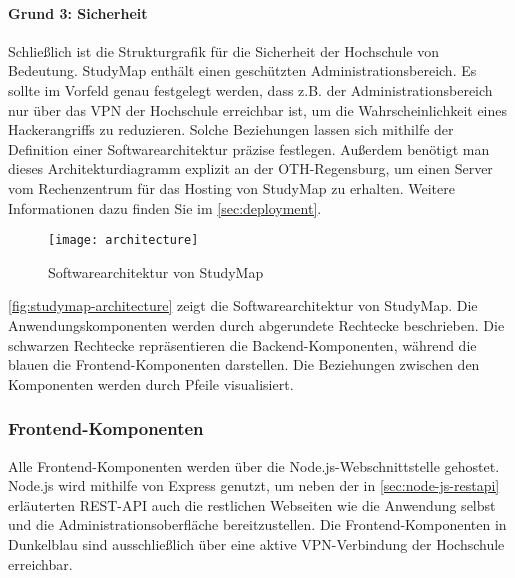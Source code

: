 \paragraph*{Grund 3: Sicherheit}
Schließlich ist die Strukturgrafik für die Sicherheit der Hochschule von Bedeutung. StudyMap enthält einen geschützten Administrationsbereich. Es sollte im Vorfeld genau festgelegt werden, dass z.B. der Administrationsbereich nur über das VPN der Hochschule erreichbar ist, um die Wahrscheinlichkeit eines Hackerangriffs zu reduzieren. Solche Beziehungen lassen sich mithilfe der Definition einer Softwarearchitektur präzise festlegen. Außerdem benötigt man dieses Architekturdiagramm explizit an der OTH-Regensburg, um einen Server vom Rechenzentrum für das Hosting von StudyMap zu erhalten. Weitere Informationen dazu finden Sie im \autoref{sec:deployment}.

\begin{figure}[H]
    \centering
    \texttt{[image: architecture]}
    \caption{Softwarearchitektur von StudyMap}
    \label{fig:studymap-architecture}
\end{figure}

\autoref{fig:studymap-architecture} zeigt die Softwarearchitektur von StudyMap. Die Anwendungskomponenten werden durch abgerundete Rechtecke beschrieben. Die schwarzen Rechtecke repräsentieren die Backend-Komponenten, während die blauen die Frontend-Komponenten darstellen. Die Beziehungen zwischen den Komponenten werden durch Pfeile visualisiert.

\subsubsection{Frontend-Komponenten}\label{sec:frontend-komponenten}
Alle Frontend-Komponenten werden über die Node.js-Webschnittstelle gehostet. Node.js wird mithilfe von Express genutzt, um neben der in \autoref{sec:node-js-restapi} erläuterten REST-API auch die restlichen Webseiten wie die Anwendung selbst und die Administrationsoberfläche bereitzustellen. Die Frontend-Komponenten in Dunkelblau sind ausschließlich über eine aktive VPN-Verbindung der Hochschule erreichbar.

